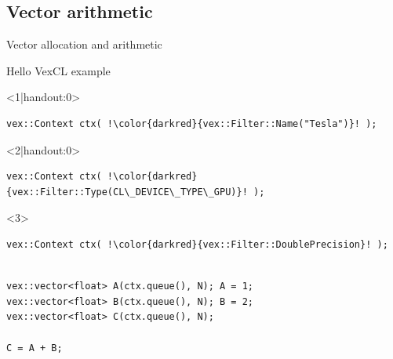 \documentclass[@BEAMER_OPTIONS@]{beamer}
\begin{document}
\subsection{Vector arithmetic}

\begin{frame}[fragile]{Vector allocation and arithmetic}
    \begin{exampleblock}{Hello VexCL example}
        \begin{onlyenv}<1|handout:0>
        \begin{lstlisting}[escapechar=!]
vex::Context ctx( !\color{darkred}{vex::Filter::Name("Tesla")}! );
        \end{lstlisting}
        \end{onlyenv}
        \begin{onlyenv}<2|handout:0>
        \begin{lstlisting}[escapechar=!]
vex::Context ctx( !\color{darkred}{vex::Filter::Type(CL\_DEVICE\_TYPE\_GPU)}! );
        \end{lstlisting}
        \end{onlyenv}
        \begin{onlyenv}<3>
        \begin{lstlisting}[escapechar=!]
vex::Context ctx( !\color{darkred}{vex::Filter::DoublePrecision}! );
        \end{lstlisting}
        \end{onlyenv}
        \begin{lstlisting}[firstnumber=last]

vex::vector<float> A(ctx.queue(), N); A = 1;
vex::vector<float> B(ctx.queue(), N); B = 2;
vex::vector<float> C(ctx.queue(), N);

C = A + B;
        \end{lstlisting}
    \end{exampleblock}
    \begin{figure}
\end{figure}
\end{frame}
\end{document}
